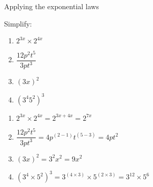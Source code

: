 % 
% 


\begin{wex}
{Applying the exponential laws}
{
\begin{minipage}{\textwidth}
Simplify:
\begin{enumerate}[itemsep=6pt, label=\textbf{\arabic*}.]
\item $2^{3x} \times 2^{4x}$
\item $\dfrac{12p^2t^5}{3pt^3}$
\item $ (3x)^2 $
\item $(3^4 5^2)^3$
\end{enumerate}
\end{minipage}
}
{
\begin{minipage}{\textwidth}
\begin{enumerate}[itemsep=6pt, label=\textbf{\arabic*}.]
\item  $2^{3x} \times 2^{4x} = 2^{3x+4x} = 2^{7x}$
 \item $\dfrac{12p^2t^5}{3pt^3} = 4p^{(2-1)}t^{(5-3)} = 4pt^2$
 \item $ (3x)^2 = 3^2x^2 = 9x^2$
 \item $(3^4\times5^2)^3 = 3^{(4\times3)}\times5^{(2\times3)} = 3^{12}\times5^6 $
\end{enumerate}
\end{minipage}
}
\end{wex}

